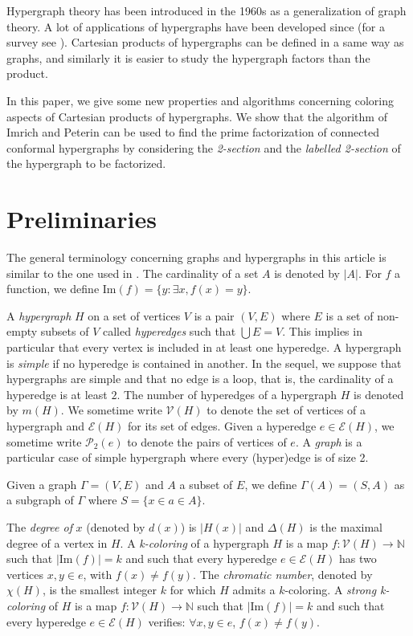 \documentclass[copyright]{eptcs}
\newcommand{\mc}[1]{\mathcal{#1}}
\newcommand{\chg}[1]{{#1}}
\begin{document}
Hypergraph theory has been introduced in the 1960s as a generalization of graph theory. A lot of applications of hypergraphs have been developed since (for a survey see \cite{Bretto}). Cartesian products of hypergraphs can be defined in a same way as graphs, and similarly it is easier to study the hypergraph factors than the product.

In this paper, we give some new properties and algorithms concerning coloring aspects of Cartesian products of hypergraphs.
We show that the algorithm of Imrich and Peterin \cite{ImPe} can be used to find the prime factorization of connected conformal hypergraphs by considering the \emph{2-section} and the \emph{labelled 2-section} of the hypergraph to be factorized.\\

\section{Preliminaries}
The general terminology concerning graphs and hypergraphs in this
article is similar to the one used in \cite{berge1,berge2}. The
cardinality of a set $A$ is denoted by $|A|$. For $f$ a function,
we define $\textrm{Im} (f) = \{ y: \exists x, f(x)= y\}$.

A \emph{hypergraph} $H$ on a set of vertices $V$ is a pair $(V,E)$
where $E$ is a set of non-empty subsets of $V$ called
\emph{hyperedges} such that $\bigcup E =V$. This implies in
particular that every vertex is included in at least one
hyperedge. A hypergraph is \emph{simple} if no hyperedge is
contained in another. In the sequel, we suppose that hypergraphs
are simple and that no edge is a loop, that is, the cardinality of
a hyperedge is at least $2$. The number of hyperedges of a
hypergraph $H$ is denoted by $m(H)$. We sometime write $\mc V(H)$
to denote the set of vertices of a hypergraph and $\mc E(H)$ for
its set of edges. Given a hyperedge $e \in \mc E(H)$, we sometime
write $\mc P_2(e)$ to denote the pairs of vertices of $e$. A
\emph{graph} is a particular case of simple hypergraph where every
(hyper)edge is of size 2.

\chg{Given a graph $\Gamma =(V,E)$ and $A$ a subset of $E$, we
define $\Gamma (A) = (S,A)$ as a subgraph of $\Gamma$ where $S =
\{x \in  a \in A\}$. }


The \emph{ degree of} $x$ (denoted by $d(x)$) is $|H(x)|$ and
$\Delta(H)$ is the maximal degree of a vertex in $H$.
A \emph{k-coloring} of a hypergraph $H$ is \chg{a map $f : \mc V(H) \rightarrow \mathbb{N}$ such that $|\textrm{Im}(f)|=k$ and  such that every hyperedge $e \in \mc E(H)$ has two vertices $x, y \in e$, with $f(x) \neq f(y)$.} The
\emph{chromatic number}, denoted by $\chi(H)$, is the smallest
integer $k$ for which $H$ admits a $k$-coloring. A \emph{strong
k-coloring} of $H$ is \chg{{a map $f : \mc V(H) \rightarrow
\mathbb{N}$ such that $|\textrm{Im}(f)|=k$ and such that every
hyperedge $e \in \mc E(H)$ verifies: $\forall x, y \in e$, $f(x)
\neq f(y)$.}}
\end{document}
